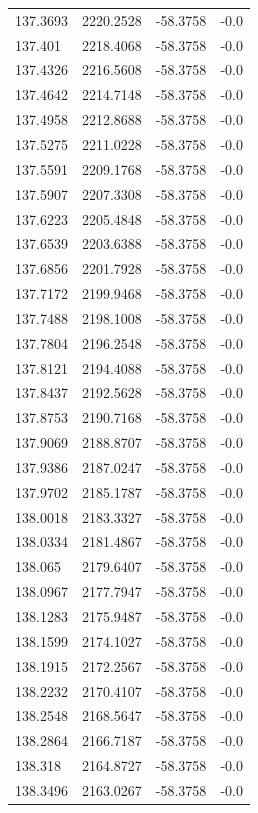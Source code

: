 \begin{table}[H]
\begin{tabular}{llll}
137.3693 & 2220.2528 & -58.3758 & -0.0 \\
137.401 & 2218.4068 & -58.3758 & -0.0 \\
137.4326 & 2216.5608 & -58.3758 & -0.0 \\
137.4642 & 2214.7148 & -58.3758 & -0.0 \\
137.4958 & 2212.8688 & -58.3758 & -0.0 \\
137.5275 & 2211.0228 & -58.3758 & -0.0 \\
137.5591 & 2209.1768 & -58.3758 & -0.0 \\
137.5907 & 2207.3308 & -58.3758 & -0.0 \\
137.6223 & 2205.4848 & -58.3758 & -0.0 \\
137.6539 & 2203.6388 & -58.3758 & -0.0 \\
137.6856 & 2201.7928 & -58.3758 & -0.0 \\
137.7172 & 2199.9468 & -58.3758 & -0.0 \\
137.7488 & 2198.1008 & -58.3758 & -0.0 \\
137.7804 & 2196.2548 & -58.3758 & -0.0 \\
137.8121 & 2194.4088 & -58.3758 & -0.0 \\
137.8437 & 2192.5628 & -58.3758 & -0.0 \\
137.8753 & 2190.7168 & -58.3758 & -0.0 \\
137.9069 & 2188.8707 & -58.3758 & -0.0 \\
137.9386 & 2187.0247 & -58.3758 & -0.0 \\
137.9702 & 2185.1787 & -58.3758 & -0.0 \\
138.0018 & 2183.3327 & -58.3758 & -0.0 \\
138.0334 & 2181.4867 & -58.3758 & -0.0 \\
138.065 & 2179.6407 & -58.3758 & -0.0 \\
138.0967 & 2177.7947 & -58.3758 & -0.0 \\
138.1283 & 2175.9487 & -58.3758 & -0.0 \\
138.1599 & 2174.1027 & -58.3758 & -0.0 \\
138.1915 & 2172.2567 & -58.3758 & -0.0 \\
138.2232 & 2170.4107 & -58.3758 & -0.0 \\
138.2548 & 2168.5647 & -58.3758 & -0.0 \\
138.2864 & 2166.7187 & -58.3758 & -0.0 \\
138.318 & 2164.8727 & -58.3758 & -0.0 \\
138.3496 & 2163.0267 & -58.3758 & -0.0 \\

\end{tabular}
\end{table}
